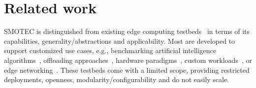 \documentclass[conference]{IEEEtran}
\begin{document}


\section{Related work}\label{sec:related-work}

SMOTEC is distinguished from existing edge computing testbeds~\cite{vasisht2017farmbeats,zhang2019hetero,gedawy2016cumulus,hao2018edge,meng2019dedas,munoz2017adrenaline,pan2016homecloud} in terms of its capabilities, generality/abstractions and applicability. Most are developed to support customized use cases, e.g., benchmarking artificial intelligence algorithms~\cite{hao2018edge,zhang2019hetero}, offloading approaches~\cite{gedawy2016cumulus}, hardware paradigms~\cite{pan2016homecloud,royuela2022testbed}, custom workloads~\cite{meng2019dedas,munoz2017adrenaline,vasisht2017farmbeats}, or edge networking~\cite{rimal2018experimental,meng2019dedas,munoz2017adrenaline}. 
These testbeds come with a limited scope, providing restricted deployments, openness, modularity/configurability and do not easily scale. 
\end{document}
